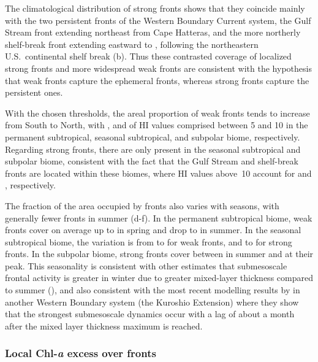 The climatological distribution of strong fronts shows that they coincide mainly with the two persistent fronts of the Western Boundary Current system, the Gulf Stream front extending northeast from Cape Hatteras, and the more northerly shelf-break front extending eastward to , following the northeastern U.S.\ continental shelf break (b).
Thus these contrasted coverage of localized strong fronts and more widespread weak fronts are consistent with the hypothesis that weak fronts capture the ephemeral fronts, whereas strong fronts capture the persistent ones.

With the chosen thresholds, the areal proportion of weak fronts tends to increase from South to North, with ,  and  of HI values comprised between 5 and 10 in the permanent subtropical, seasonal subtropical, and subpolar biome, respectively.
Regarding strong fronts, there are only present in the seasonal subtropical and subpolar biome, consistent with the fact that the Gulf Stream and shelf-break fronts are located within these biomes, where HI values above~10 account for  and , respectively.

The fraction of the area occupied by fronts also varies with seasons, with generally fewer fronts in summer (d-f).
In the permanent subtropical biome, weak fronts cover on average up to  in spring and drop to  in summer.
In the seasonal subtropical biome, the variation is from  to  for weak fronts, and  to  for strong fronts.
In the subpolar biome, strong fronts cover between  in summer and  at their peak.
This seasonality is consistent with other estimates that submesoscale frontal activity is greater in winter due to greater mixed-layer thickness compared to summer (\cite{callies_2015}), and also consistent with the most recent modelling results by \textcite{dong_2020} in another Western Boundary system (the Kuroshio Extension) where they show that the strongest submesoscale dynamics occur with a lag of about a month after the mixed layer thickness maximum is reached.


\subsubsection{Local Chl-\textit{a} excess over fronts}

